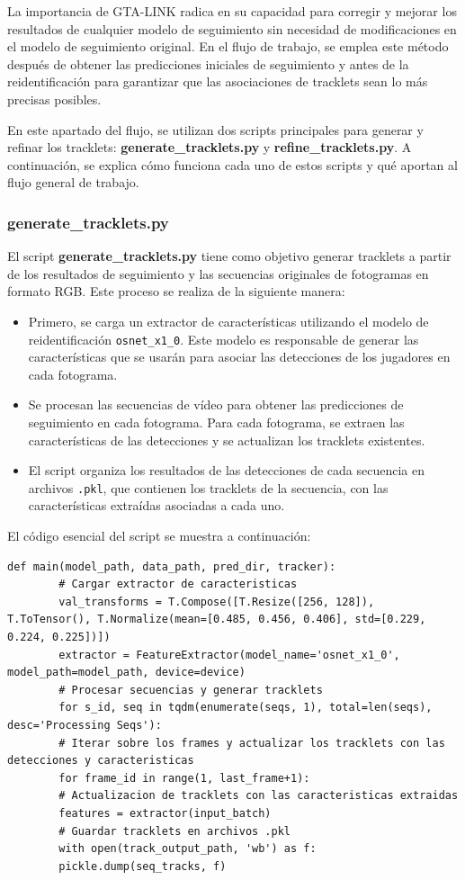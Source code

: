 \documentclass[12pt, a4paper, twoside]{article}
\begin{document}
	La importancia de GTA-LINK radica en su capacidad para corregir y mejorar los resultados de cualquier modelo de seguimiento sin necesidad de modificaciones en el modelo de seguimiento original. En el flujo de trabajo, se emplea este método después de obtener las predicciones iniciales de seguimiento y antes de la reidentificación para garantizar que las asociaciones de tracklets sean lo más precisas posibles.
	
	
	En este apartado del flujo, se utilizan dos scripts principales para generar y refinar los tracklets: \textbf{generate\_tracklets.py} y \textbf{refine\_tracklets.py}. A continuación, se explica cómo funciona cada uno de estos scripts y qué aportan al flujo general de trabajo.
	
	\subsubsection{generate\_tracklets.py}
	
	El script \textbf{generate\_tracklets.py} tiene como objetivo generar tracklets a partir de los resultados de seguimiento y las secuencias originales de fotogramas en formato RGB. Este proceso se realiza de la siguiente manera:
	
	\begin{itemize}
		\item Primero, se carga un extractor de características utilizando el modelo de reidentificación \texttt{osnet\_x1\_0}. Este modelo es responsable de generar las características que se usarán para asociar las detecciones de los jugadores en cada fotograma.
		\item Se procesan las secuencias de vídeo para obtener las predicciones de seguimiento en cada fotograma. Para cada fotograma, se extraen las características de las detecciones y se actualizan los tracklets existentes.
		\item El script organiza los resultados de las detecciones de cada secuencia en archivos \texttt{.pkl}, que contienen los tracklets de la secuencia, con las características extraídas asociadas a cada uno.
	\end{itemize}
	
	El código esencial del script se muestra a continuación:
	
	\begin{lstlisting}[style=pythonstyle]
		def main(model_path, data_path, pred_dir, tracker):
		# Cargar extractor de caracteristicas
		val_transforms = T.Compose([T.Resize([256, 128]), T.ToTensor(), T.Normalize(mean=[0.485, 0.456, 0.406], std=[0.229, 0.224, 0.225])])
		extractor = FeatureExtractor(model_name='osnet_x1_0', model_path=model_path, device=device)
		# Procesar secuencias y generar tracklets
		for s_id, seq in tqdm(enumerate(seqs, 1), total=len(seqs), desc='Processing Seqs'):
		# Iterar sobre los frames y actualizar los tracklets con las detecciones y caracteristicas
		for frame_id in range(1, last_frame+1):
		# Actualizacion de tracklets con las caracteristicas extraidas
		features = extractor(input_batch)
		# Guardar tracklets en archivos .pkl
		with open(track_output_path, 'wb') as f:
		pickle.dump(seq_tracks, f)
	\end{lstlisting}
	
\end{document}
